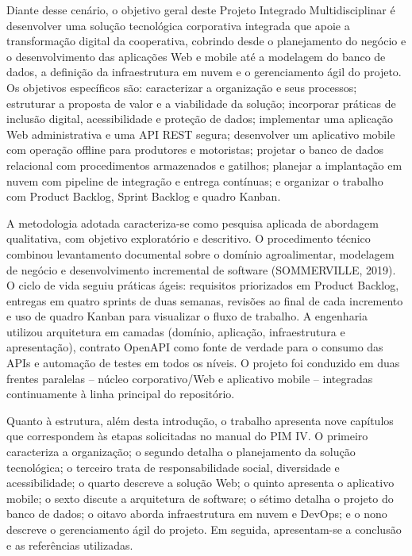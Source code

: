 \documentclass[12pt,a4paper]{article}
\begin{document}
Diante desse cenário, o objetivo geral deste Projeto Integrado Multidisciplinar
é desenvolver uma solução tecnológica corporativa integrada que apoie a
transformação digital da cooperativa, cobrindo desde o planejamento do negócio e
o desenvolvimento das aplicações Web e mobile até a modelagem do banco de dados,
a definição da infraestrutura em nuvem e o gerenciamento ágil do projeto. Os
objetivos específicos são: caracterizar a organização e seus processos;
estruturar a proposta de valor e a viabilidade da solução; incorporar práticas de
inclusão digital, acessibilidade e proteção de dados; implementar uma aplicação
Web administrativa e uma API REST segura; desenvolver um aplicativo mobile com
operação offline para produtores e motoristas; projetar o banco de dados
relacional com procedimentos armazenados e gatilhos; planejar a implantação em
nuvem com pipeline de integração e entrega contínuas; e organizar o trabalho com
Product Backlog, Sprint Backlog e quadro Kanban.

A metodologia adotada caracteriza-se como pesquisa aplicada de abordagem
qualitativa, com objetivo exploratório e descritivo. O procedimento técnico
combinou levantamento documental sobre o domínio agroalimentar, modelagem de
negócio e desenvolvimento incremental de software (SOMMERVILLE, 2019). O
ciclo de vida seguiu
práticas ágeis: requisitos priorizados em Product Backlog, entregas em quatro
sprints de duas semanas, revisões ao final de cada incremento e uso de quadro
Kanban para visualizar o fluxo de trabalho. A engenharia utilizou arquitetura em
camadas (domínio, aplicação, infraestrutura e apresentação), contrato OpenAPI
como fonte de verdade para o consumo das APIs e automação de testes em todos os
níveis. O projeto foi conduzido em duas frentes paralelas -- núcleo
corporativo/Web e aplicativo mobile -- integradas continuamente à linha principal
do repositório.

Quanto à estrutura, além desta introdução, o trabalho apresenta nove capítulos
que correspondem às etapas solicitadas no manual do PIM IV. O primeiro
caracteriza a organização; o segundo detalha o planejamento da solução
tecnológica; o terceiro trata de responsabilidade social, diversidade e
acessibilidade; o quarto descreve a solução Web; o quinto apresenta o aplicativo
mobile; o sexto discute a arquitetura de software; o sétimo detalha o projeto do
banco de dados; o oitavo aborda infraestrutura em nuvem e DevOps; e o nono
descreve o gerenciamento ágil do projeto. Em seguida, apresentam-se a conclusão e
as referências utilizadas.












\end{document}
